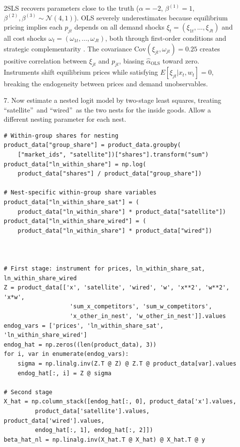 \documentclass[english,11pt]{article}
\begin{document}
\begin{enumerate}
2SLS recovers parameters close to the truth ($\alpha = -2$, $\beta^{(1)} = 1$, $\beta^{(2)}, \beta^{(3)}  \sim \mathcal{N}(4,1)$). OLS severely underestimates because equilibrium pricing implies each $p_{jt}$ depends on all demand shocks $\xi_t = (\xi_{1t}, \ldots, \xi_{Jt})$ and all cost shocks $\omega_t = (\omega_{1t}, \ldots, \omega_{Jt})$, both through first-order conditions and strategic complementarity \citep{berry2021foundations}. The covariance $\text{Cov}(\xi_{jt}, \omega_{jt}) = 0.25$ creates positive correlation between $\xi_{jt}$ and $p_{jt}$, biasing $\hat{\alpha}_{\text{OLS}}$ toward zero. Instruments shift equilibrium prices  while satisfying $E[\xi_{jt} | x_t, w_t] = 0$, breaking the endogeneity between prices and demand unobservables.

\item[7.] Now estimate a nested logit model by two-stage least squares,
treating \textquotedblleft satellite\textquotedblright\ and
\textquotedblleft wired\textquotedblright\ as the two nests for the inside
goods. Allow a different nesting parameter for each nest.

\begin{verbatim}
# Within-group shares for nesting
product_data["group_share"] = product_data.groupby(
    ["market_ids", "satellite"])["shares"].transform("sum")
product_data["ln_within_share"] = np.log(
    product_data["shares"] / product_data["group_share"])

# Nest-specific within-group share variables
product_data["ln_within_share_sat"] = (
    product_data["ln_within_share"] * product_data["satellite"])
product_data["ln_within_share_wired"] = (
    product_data["ln_within_share"] * product_data["wired"])



# First stage: instrument for prices, ln_within_share_sat, ln_within_share_wired
Z = product_data[['x', 'satellite', 'wired', 'w', 'x**2', 'w**2', 'x*w',
                   'sum_x_competitors', 'sum_w_competitors', 
                   'x_other_in_nest', 'w_other_in_nest']].values
endog_vars = ['prices', 'ln_within_share_sat', 'ln_within_share_wired']
endog_hat = np.zeros((len(product_data), 3))
for i, var in enumerate(endog_vars):
    sigma = np.linalg.inv(Z.T @ Z) @ Z.T @ product_data[var].values
    endog_hat[:, i] = Z @ sigma

# Second stage
X_hat = np.column_stack([endog_hat[:, 0], product_data['x'].values,
         product_data['satellite'].values, product_data['wired'].values,
         endog_hat[:, 1], endog_hat[:, 2]])
beta_hat_nl = np.linalg.inv(X_hat.T @ X_hat) @ X_hat.T @ y


\end{verbatim}
\end{enumerate}
\end{document}
